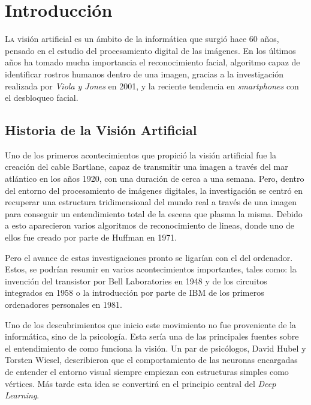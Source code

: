 
\chapter{Introducción}

\lettrine[lines=4]{L}{a} visión artificial  es un ámbito de la informática que surgió hace 60 años, pensado en el estudio del procesamiento digital de las imágenes. En los últimos años ha tomado mucha importancia el reconocimiento facial, algoritmo capaz de identificar rostros humanos dentro de una imagen,  gracias a la investigación realizada por \textit{Viola y Jones} en 2001, y la reciente tendencia en \textit{smartphones} con el desbloqueo facial. 

\section{Historia de la Visión Artificial}

Uno de los primeros acontecimientos que propició la visión artificial fue la creación del cable Bartlane, capaz de transmitir una imagen a través del mar atlántico en los años 1920, con una duración de cerca a una semana. Pero, dentro del entorno del procesamiento de imágenes digitales, la investigación se centró en recuperar una estructura tridimensional del mundo real a través de una imagen para conseguir un entendimiento total de la escena que plasma la misma. Debido a esto aparecieron varios algoritmos de reconocimiento de lineas, donde uno de ellos fue creado por parte de Huffman en 1971.

Pero el avance de estas investigaciones pronto se ligarían con el del ordenador. Estos, se podrían resumir en varios acontecimientos importantes, tales como: la invención del transistor por Bell Laboratories en 1948 y de los circuitos integrados en 1958 o la introducción por parte de IBM de los primeros ordenadores personales en 1981. \cite{gonzalez_woods_2018}

Uno de los descubrimientos que inicio este movimiento no fue proveniente de la informática, sino de la psicología. Esta sería una de las principales fuentes sobre el entendimiento de como funciona la visión.  Un par de psicólogos, David Hubel y Torsten Wiesel, describieron que el comportamiento de las neuronas encargadas de entender el entorno visual siempre empiezan con estructuras simples como vértices. Más tarde esta idea se convertirá en el principio central del \textit{Deep Learning}.

